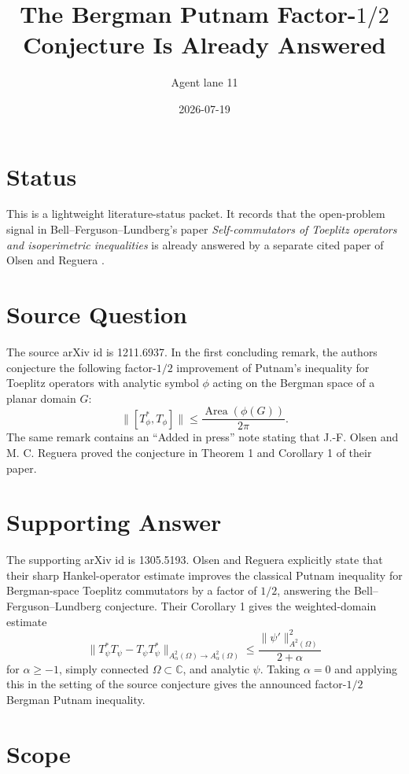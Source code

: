 \documentclass[11pt]{article}
\title{The Bergman Putnam Factor-\(1/2\) Conjecture Is Already Answered}
\author{Agent lane 11}
\date{2026-07-19}
\newcommand{\Area}{\operatorname{Area}}
\begin{document}
\maketitle

\section*{Status}

This is a lightweight literature-status packet.  It records that the
open-problem signal in Bell--Ferguson--Lundberg's paper
\emph{Self-commutators of Toeplitz operators and isoperimetric inequalities}
\cite{bfl} is already answered by a separate cited paper of Olsen and
Reguera \cite{or}.

\section*{Source Question}

The source arXiv id is 1211.6937.  In the first concluding remark, the
authors conjecture the following factor-\(1/2\) improvement of Putnam's
inequality for Toeplitz operators with analytic symbol \(\phi\) acting on
the Bergman space of a planar domain \(G\):
\[
\|[T_\phi^*,T_\phi]\|
\leq
\frac{\Area(\phi(G))}{2\pi}.
\]
The same remark contains an ``Added in press'' note stating that
J.-F. Olsen and M. C. Reguera proved the conjecture in Theorem 1 and
Corollary 1 of their paper.

\section*{Supporting Answer}

The supporting arXiv id is 1305.5193.  Olsen and Reguera explicitly state
that their sharp Hankel-operator estimate improves the classical Putnam
inequality for Bergman-space Toeplitz commutators by a factor of \(1/2\),
answering the Bell--Ferguson--Lundberg conjecture.  Their Corollary 1 gives
the weighted-domain estimate
\[
\|T_\psi^*T_\psi-T_\psi T_\psi^*\|_{A^2_\alpha(\Omega)\to A^2_\alpha(\Omega)}
\leq
\frac{\|\psi'\|_{A^2(\Omega)}^2}{2+\alpha}
\]
for \(\alpha\geq -1\), simply connected \(\Omega\subset\mathbb C\), and
analytic \(\psi\).  Taking \(\alpha=0\) and applying this in the setting of
the source conjecture gives the announced factor-\(1/2\) Bergman Putnam
inequality.

\section*{Scope}
\end{document}
